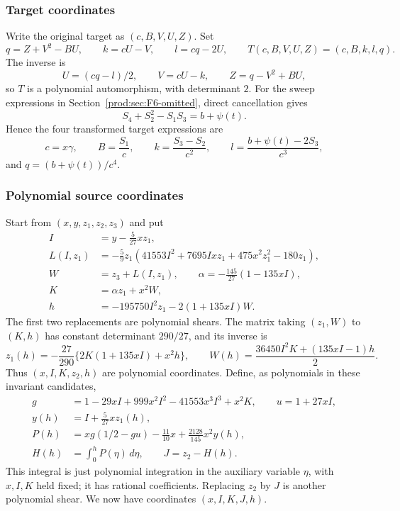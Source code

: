 \documentclass[11pt]{article}
\numberwithin{equation}{section}
\theoremstyle{plain}
\theoremstyle{definition}
\theoremstyle{remark}
\begin{document}
\subsubsection{Target coordinates}
Write the original target as $(c,B,V,U,Z)$. Set
\begin{equation}\label{prod:eq:F6target}
 q=Z+V^2-BU,\qquad k=cU-V,\qquad l=cq-2U,
 \qquad T(c,B,V,U,Z)=(c,B,k,l,q).
\end{equation}
The inverse is
\[
 U=(cq-l)/2,\qquad V=cU-k,\qquad Z=q-V^2+BU,
\]
so $T$ is a polynomial automorphism, with determinant $2$.
For the sweep expressions in Section~\ref{prod:sec:F6-omitted}, direct cancellation gives
\begin{equation}\label{prod:eq:F6shadowq}
 S_4+S_2^2-S_1S_3=b+\psi(t).
\end{equation}
Hence the four transformed target expressions are
\[
 c=x\gamma,\qquad B=\frac{S_1}{c},\qquad
 k=\frac{S_3-S_2}{c^2},\qquad
 l=\frac{b+\psi(t)-2S_3}{c^3},
\]
and $q=(b+\psi(t))/c^4$.

\subsubsection{Polynomial source coordinates}
Start from $(x,y,z_1,z_2,z_3)$ and put
\begin{align*}
 I&=y-\frac5{27}xz_1,\\
 L(I,z_1)&=-\frac59z_1
 (41553I^2+7695Ixz_1+475x^2z_1^2-180z_1),\\
 W&=z_3+L(I,z_1),\qquad
 \alpha=-\frac{145}{27}(1-135xI),\\
 K&=\alpha z_1+x^2W,\\
 h&=-195750I^2z_1-2(1+135xI)W.
\end{align*}
The first two replacements are polynomial shears. The matrix taking
$(z_1,W)$ to $(K,h)$ has constant determinant $290/27$, and its inverse is
\begin{equation}\label{prod:eq:F6zinverse}
 z_1(h)=-\frac{27}{290}\{2K(1+135xI)+x^2h\},\qquad
 W(h)=\frac{36450I^2K+(135xI-1)h}{2}.
\end{equation}
Thus $(x,I,K,z_2,h)$ are polynomial coordinates. Define, as polynomials
in these invariant candidates,
\begin{align*}
 g&=1-29xI+999x^2I^2-41553x^3I^3+x^2K,\qquad u=1+27xI,\\
 y(h)&=I+\frac5{27}xz_1(h),\\
 P(h)&=xg(1/2-gu)-\frac{11}{10}x+\frac{2128}{145}x^2y(h),\\
 H(h)&=\int_0^h P(\eta)\,d\eta,\qquad J=z_2-H(h).
\end{align*}
This integral is just polynomial integration in the auxiliary variable
$\eta$, with $x,I,K$ held fixed; it has rational coefficients. Replacing
$z_2$ by $J$ is another polynomial shear. We now have coordinates
$(x,I,K,J,h)$.
\end{document}
